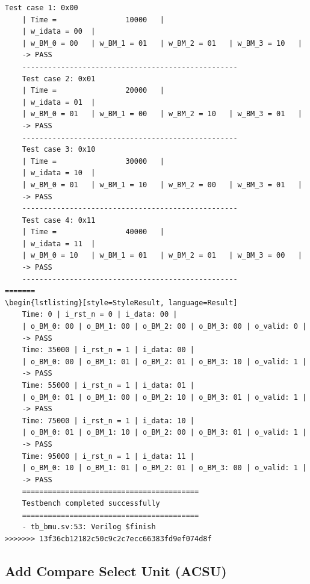 \begin{lstlisting}[style=StyleResult, language=Result, caption={The Result of testing BMU}]
	Test case 1: 0x00
	| Time =                10000 	|
	| w_idata = 00 	|
	| w_BM_0 = 00 	| w_BM_1 = 01 	| w_BM_2 = 01 	| w_BM_3 = 10 	|
	-> PASS
	--------------------------------------------------
	Test case 2: 0x01
	| Time =                20000 	|
	| w_idata = 01 	|
	| w_BM_0 = 01 	| w_BM_1 = 00 	| w_BM_2 = 10 	| w_BM_3 = 01 	|
	-> PASS
	--------------------------------------------------
	Test case 3: 0x10
	| Time =                30000 	|
	| w_idata = 10 	|
	| w_BM_0 = 01 	| w_BM_1 = 10 	| w_BM_2 = 00 	| w_BM_3 = 01 	|
	-> PASS
	--------------------------------------------------
	Test case 4: 0x11
	| Time =                40000 	|
	| w_idata = 11 	|
	| w_BM_0 = 10 	| w_BM_1 = 01 	| w_BM_2 = 01 	| w_BM_3 = 00 	|
	-> PASS
	--------------------------------------------------
=======
\begin{lstlisting}[style=StyleResult, language=Result]
	Time: 0 | i_rst_n = 0 | i_data: 00 |
	| o_BM_0: 00 | o_BM_1: 00 | o_BM_2: 00 | o_BM_3: 00 | o_valid: 0 |
	-> PASS
	Time: 35000 | i_rst_n = 1 | i_data: 00 |
	| o_BM_0: 00 | o_BM_1: 01 | o_BM_2: 01 | o_BM_3: 10 | o_valid: 1 |
	-> PASS
	Time: 55000 | i_rst_n = 1 | i_data: 01 |
	| o_BM_0: 01 | o_BM_1: 00 | o_BM_2: 10 | o_BM_3: 01 | o_valid: 1 |
	-> PASS
	Time: 75000 | i_rst_n = 1 | i_data: 10 |
	| o_BM_0: 01 | o_BM_1: 10 | o_BM_2: 00 | o_BM_3: 01 | o_valid: 1 |
	-> PASS
	Time: 95000 | i_rst_n = 1 | i_data: 11 |
	| o_BM_0: 10 | o_BM_1: 01 | o_BM_2: 01 | o_BM_3: 00 | o_valid: 1 |
	-> PASS
	=========================================
	Testbench completed successfully
	=========================================
	- tb_bmu.sv:53: Verilog $finish
>>>>>>> 13f36cb12182c50c9c2c7ecc66383fd9ef074d8f
\end{lstlisting}

\subsection{Add Compare Select Unit (ACSU)}

